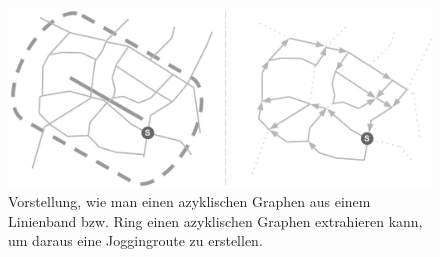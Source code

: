 \documentclass[12pt]{article}
\begin{document}
\begin{figure}[ht]
	\begin{center}
	\includegraphics[width=\textwidth]{pics/pdf/011_Ring_Schaplone.pdf}
	\caption{Vorstellung, wie man einen azyklischen Graphen aus einem Linienband bzw. Ring einen azyklischen Graphen extrahieren kann, um daraus eine Joggingroute zu erstellen.}
	\label{pic:ring_schaplone}
	\end{center}
\end{figure}

\pagebreak





\pagebreak

\listoffigures

\pagebreak

\end{document}
